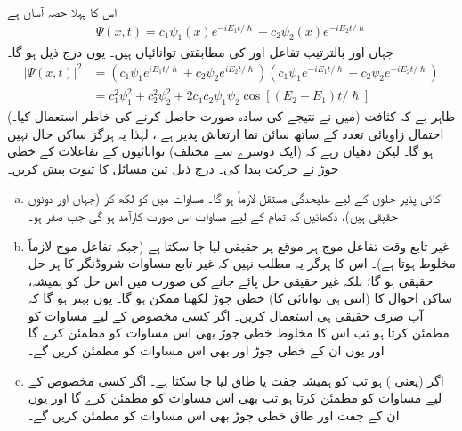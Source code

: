اس کا پہلا حصہ آسان ہے
\begin{align*}
\Psi (x,t) = c_{1} \psi_{1}(x)e^{-iE_{1}t/\hslash} + c_{2} \psi_{2}(x)e^{-iE_{2}t/\hslash}
\end{align*}
جہاں  اور  بالترتیب تفاعل  اور  کی مطابقتی توانائیاں ہیں۔ یوں  درج ذیل ہو گا۔ 
\begin{align*}
\left| \Psi (x,t) \right|^{2} &= \left( c_{1} \psi_{1} e^{iE_{1}t/\hslash} + c_{2} \psi_{2} e^{iE_{2}t/\hslash} \right) \left( c_{1} \psi_{1} e^{-iE_{1}t/\hslash} + c_{2} \psi_{2} e^{-iE_{2}t/\hslash} \right) \\
&= c_{1}^{2} \psi_{1}^{2} + c_{2}^{2} \psi_{2}^{2} + 2c_{1}c_{2}\psi_{1}\psi_{2} \cos [ ( E_{2} - E_{1})t/\hslash]
\end{align*}
(میں نے نتیجے  کی سادہ صورت حاصل کرنے کی خاطر   استعمال کیا۔)  ظاہر ہے کہ کثافت احتمال زاویائی
 تعدد  کے ساتھ سائن نما ارتعاش پذیر ہے ، لہٰذا یہ ہرگز ساکن حال نہیں ہو گا۔ لیکن دھیان رہے کہ (ایک دوسرے سے مختلف) توانائیوں کے تفاعلات کے خطی جوڑ نے  حرکت پیدا کی۔ 
درج ذیل تین مسائل کا ثبوت پیش کریں۔
\begin{enumerate}[a.]
\item
اکائی پذیر حلوں کے لیے علیحدگی مستقل   لازماً  ہو گا۔   مساوات  میں   کو  لکھ کر (جہاں  اور  دونوں حقیقی ہیں)،  دکھائیں کہ تمام  کے لیے مساوات  اس صورت کارآمد ہو گی جب   صفر ہو۔  
\item
غیر تابع وقت تفاعل موج  ہر موقع پر حقیقی لیا جا سکتا ہے (جبکہ تفاعل موج  لازماً مخلوط ہوتا ہے)۔ اس کا ہرگز یہ مطلب نہیں  کہ غیر تابع مساوات شروڈنگر کا ہر حل حقیقی ہو گا؛ بلکہ غیر حقیقی حل پائے جانے کی صورت میں اس حل کو ہمیشہ، ساکن احوال کا (اتنی ہی توانائی کا) خطی جوڑ لکھنا ممکن ہو گا۔ یوں بہتر ہو گا کہ آپ صرف حقیقی   ہی استعمال کریں۔  اگر کسی مخصوص  کے لیے  مساوات  کو مطمئن کرتا ہو تب اس کا مخلوط خطی جوڑ بھی اس مساوات کو مطمئن کرے گا اور یوں ان کے خطی جوڑ  اور  بھی اس مساوات کو مطمئن کریں گے۔
\item
اگر     (یعنی )    ہو تب  کو ہمیشہ جفت یا طاق لیا جا سکتا ہے۔  اگر کسی مخصوص  کے لیے  مساوات  کو مطمئن کرتا ہو تب  بھی اس مساوات کو مطمئن کرے گا اور یوں ان کے جفت اور طاق خطی جوڑ  بھی اس مساوات کو مطمئن کریں گے۔ 
\end{enumerate}
